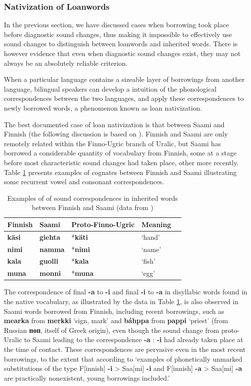\documentclass[svgnames,12pt]{scrartcl}
\newcommand{\ipa}[1]{\textbf{{\phon\mbox{#1}}}}
\begin{document}
{{\subsubsection{Nativization of Loanwords}
In the previous section, we have discussed cases when borrowing took place before diagnostic sound changes, thus making it impossible to effectively use sound changes to distinguish between loanwords and inherited words. There is however evidence that even when diagnostic sound changes exist, they may not always be an absolutely reliable criterion.

When a particular language contains a sizeable layer of borrowings from another language, bilingual speakers can develop a intuition of the phonological correspondences between the two languages, and apply these correspondences to newly borrowed words, a phenomenon known as loan nativization.

The best documented case of loan nativization is that between Saami and Finnish (the following discussion is based on \citealt{aikio06nativization}). Finnish and Saami are only remotely related within the Finno-Ugric branch of Uralic, but  Saami has borrowed a considerable quantity of vocabulary from Finnish, some at a stage before most characteristic sound changes had taken place, other more recently. Table \ref{tab:native} presents examples of cognates between Finnish and Saami illustrating some recurrent vowel and consonant correspondences.

\begin{table}[h]
\caption{Examples of of sound correspondences in inherited words between Finnish and Saami (data from \citealt[27]{aikio06nativization})} \centering \label{tab:native}
\begin{tabular}{lllll}
\toprule
Finnish & Saami & Proto-Finno-Ugric & Meaning \\
\midrule
\ipa{käsi} & \ipa{giehta} & *\ipa{käti} & `hand' \\
\ipa{nimi} & \ipa{namma} & *\ipa{nimi} & `name' \\
\ipa{kala} & \ipa{guolli} & *\ipa{kala} & `fish' \\
\ipa{muna} & \ipa{monni} & *\ipa{muna} & `egg' \\
\bottomrule
\end{tabular}
\end{table}

The correspondence of final \ipa{-a} to \ipa{-i} and final \ipa{-i} to \ipa{-a} in disyllabic words found in the native vocabulary, as illustrated by the data in Table \ref{tab:native}, is also observed in Saami words borrowed from Finnish, including recent borrowings, such as \ipa{mearka} from \ipa{merkki} `sign, mark' and \ipa{báhppa} from \ipa{pappi} `priest' (from Russian \ipa{поп}, itself of Greek origin), even though the sound change from proto-Uralic to Saami leading to the correspondence \ipa{-a} : \ipa{-i} had already taken place at the time of contact. These correspondences are pervasive even in the most recent borrowings, to the extent that according to \citet[36]{aikio06nativization} `examples of phonetically unmarked substitutions of the type F[innish] \ipa{-i} > Saa[mi] \ipa{-i} and F[innish] \ipa{-a} > Saa[mi] \ipa{-a} are practically nonexistent, young borrowings included.'

}}
\end{document}
